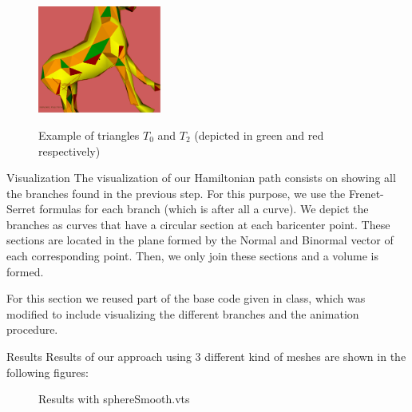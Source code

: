 \documentclass[conference]{IEEEtran}
\makeatletter
\renewcommand\section{\@startsection{section}{1}{\z@}
                                  {-3.0ex plus -1.5ex minus -0.5ex}
                                  {0.7ex plus 1ex minus 0ex}
                                  {\bfseries}}
\renewcommand\subsection{\@startsection{subsection}{1}{\z@}
                                  {-2.0ex plus -1.5ex minus -0.5ex}
                                  {0.7ex plus 1ex minus 0ex}
                                  {\itshape\bfseries}}
\makeatother
\begin{document}
\begin{figure}[h]
\centering
\includegraphics[height=100pt]{images/trianglesT02.png} 
\label{fig:trianglesT02}		
\caption{Example of triangles $T_{0}$ and $T_{2}$ (depicted in green and red respectively)}
\end{figure}

\subsection{Visualization}
The visualization of our Hamiltonian path consists on showing all the branches found in the previous step. For this purpose, we use the Frenet-Serret formulas for each branch (which is after all a curve). We depict the branches as curves that have a circular section at each baricenter point. These sections are located in the plane formed by the Normal and Binormal vector of each corresponding point. Then, we only join these sections and a volume is formed.

For this section we reused part of the base code given in class, which was modified to include visualizing the different branches and the animation procedure.

\section{Results}
\label{sec:Results}
Results of our approach using 3 different kind of meshes are shown in the following figures:

\begin{figure}[h]
		\centering
          \caption{Results with sphereSmooth.vts}
          \label{fig:sphereResult}
\end{figure}
\end{document}
